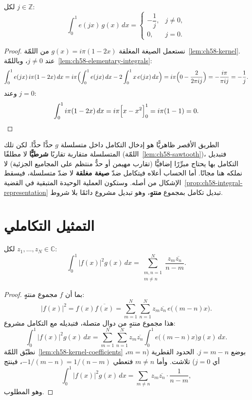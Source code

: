 \begin{lemma}
\label{lem:ch58-kernel-coefficients}
\provedhere
لكل \(j\in\mathbb{Z}\):
\[
\int_0^1e(jx)\,g(x)\,dx=
\begin{cases}
-\dfrac1j, & j\ne0,\\[2mm]
0, & j=0.
\end{cases}
\]
\end{lemma}

\begin{proof}
نستعمل الصيغة المغلقة \(g(x)=i\pi(1-2x)\) من
اللمّة~\ref{lem:ch58-kernel}. عند \(j\ne0\)، وباللمّة~\ref{lem:ch58-elementary-integrals}:
\[
\int_0^1e(jx)\,i\pi(1-2x)\,dx
=i\pi\Bigl(\int_0^1e(jx)\,dx-2\int_0^1x\,e(jx)\,dx\Bigr)
=i\pi\Bigl(0-\frac{2}{2\pi ij}\Bigr)
=-\frac{i\pi}{\pi ij}
=-\frac1j.
\]
وعند \(j=0\):
\[
\int_0^1i\pi(1-2x)\,dx
=i\pi\Bigl[x-x^2\Bigr]_0^1
=i\pi(1-1)=0.
\]
\end{proof}

\begin{remark}
\label{rem:ch58-why-closed-form}
الطريق الأقصر ظاهريًّا هو إدخال التكامل داخل متسلسلة \(g\) حدًّا حدًّا.
لكن تلك المتسلسلة متقاربة تقاربًا \textbf{شرطيًّا} لا مطلقًا
(اللمّة~\ref{lem:ch58-sawtooth})، فتبديل التكامل بها يحتاج مبرِّرًا
إضافيًّا (تقارب مهيمن أو حدٌّ منتظم على المجاميع الجزئية) لا نملكه هنا
مجانًا. أما الحساب أعلاه فيتكامل ضدّ \textbf{صيغة مغلقة} لا ضدّ متسلسلة،
فيسقط الإشكال من أصله. وستكون العملية الوحيدة المتبقية في
القضية~\ref{prop:ch58-integral-representation} تبديل تكامل بمجموع
\textbf{منتهٍ}، وهو تبديل مشروع دائمًا بلا شروط.
\end{remark}

\section{التمثيل التكاملي}

\begin{proposition}
\label{prop:ch58-integral-representation}
\provedhere
لكل \(z_1,\dots,z_N\in\mathbb{C}\):
\[
\int_0^1\lvert f(x)\rvert^2g(x)\,dx
=\sum_{\substack{m,n=1\\m\ne n}}^{N}\frac{z_m\overline{z_n}}{n-m}.
\]
\end{proposition}

\begin{proof}
بما أن \(f\) مجموع منتهٍ:
\[
\lvert f(x)\rvert^2
=f(x)\overline{f(x)}
=\sum_{m=1}^{N}\sum_{n=1}^{N}z_m\overline{z_n}\,e\bigl((m-n)x\bigr).
\]
هذا مجموع منتهٍ من دوال متصلة، فتبديله مع التكامل مشروع:
\[
\int_0^1\lvert f(x)\rvert^2g(x)\,dx
=\sum_{m=1}^{N}\sum_{n=1}^{N}z_m\overline{z_n}\int_0^1e\bigl((m-n)x\bigr)g(x)\,dx.
\]
نطبّق اللمّة~\ref{lem:ch58-kernel-coefficients} بوضع \(j=m-n\). الحدود
القطرية (\(m=n\)، أي \(j=0\)) تلاشت. وأما \(m\ne n\) فتعطي
\(-1/(m-n)=1/(n-m)\)، فينتج
\[
\int_0^1\lvert f(x)\rvert^2g(x)\,dx
=\sum_{m\ne n}z_m\overline{z_n}\cdot\frac{1}{n-m},
\]
وهو المطلوب.
\end{proof}

